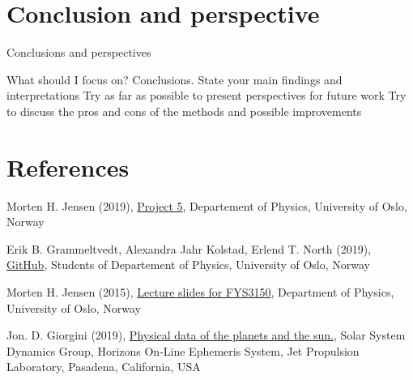 \documentclass{article}
\begin{document}
\section{Conclusion and perspective} \label{sec:Conclusion}

Conclusions and perspectives


What should I focus on? Conclusions.
State your main findings and interpretations
Try as far as possible to present perspectives for future work
Try to discuss the pros and cons of the methods and possible improvements


\vspace{1cm}

\section{References} \label{sec:References}

\iffalse
What should I focus on? References.
Give always references to material you base your work on, either scientific articles/reports or books.
Refer to articles as: name(s) of author(s), journal, volume (boldfaced), page and year in parenthesis.
Refer to books as: name(s) of author(s), title of book, publisher, place and year, eventual page numbers
\fi

\begin{thebibliography}{}

Morten H. Jensen (2019), \href{https://github.com/CompPhysics/ComputationalPhysics/blob/master/doc/Projects/2019/Project5/SolarSystem/pdf/SolarSystem.pdf}{Project 5}, Departement of Physics, University of Oslo, Norway

Erik B. Grammeltvedt, Alexandra Jahr Kolstad, Erlend T. North (2019), \href{https://github.com/Erikbgram/Fys3150}{GitHub}, Students of Departement of Physics, University of Oslo, Norway

Morten H. Jensen (2015), \href{https://github.com/CompPhysics/ComputationalPhysics/blob/master/doc/Lectures/lectures2015.pdf}{Lecture slides for FYS3150}, Department of Physics, University of Oslo, Norway

Jon. D. Giorgini (2019), \href{https://ssd.jpl.nasa.gov/horizons.cgi#top}{Physical data of the planets and the sun.}, Solar System Dynamics Group, Horizons On-Line Ephemeris System, Jet Propulsion Laboratory, Pasadena, California, USA


\end{thebibliography}
\end{document}
